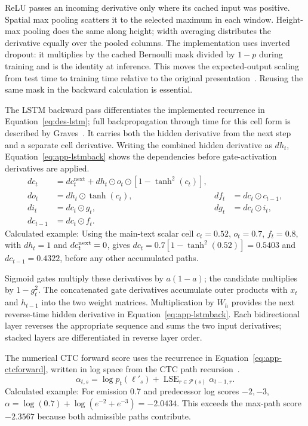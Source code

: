 ReLU passes an incoming derivative only where its cached input was positive. Spatial max pooling scatters it to the selected maximum in each window. Height-max pooling does the same along height; width averaging distributes the derivative equally over the pooled columns. The implementation uses inverted dropout: it multiplies by the cached Bernoulli mask divided by $1-p$ during training and is the identity at inference. This moves the expected-output scaling from test time to training time relative to the original presentation~\cite[pp.~1931, 1934]{srivastava2014}. Reusing the same mask in the backward calculation is essential.

The LSTM backward pass differentiates the implemented recurrence in Equation~\ref{eq:des-lstm}; full backpropagation through time for this cell form is described by Graves~\cite[pp.~4--5]{graves2013}. It carries both the hidden derivative from the next step and a separate cell derivative. Writing the combined hidden derivative as $d h_t$, Equation~\ref{eq:app-lstmback} shows the dependencies before gate-activation derivatives are applied.
\begin{equation}
\begin{aligned}
d c_t&=d c_t^{\mathrm{next}}+d h_t\odot o_t\odot[1-\tanh^2(c_t)],\\
d o_t&=d h_t\odot\tanh(c_t),& d f_t&=d c_t\odot c_{t-1},\\
d i_t&=d c_t\odot g_t,&d g_t&=d c_t\odot i_t,\\
d c_{t-1}&=d c_t\odot f_t.
\end{aligned}
\label{eq:app-lstmback}
\end{equation}
Calculated example: Using the main-text scalar cell $c_t=0.52$, $o_t=0.7$, $f_t=0.8$, with $dh_t=1$ and $dc_t^{\rm next}=0$, gives $dc_t=0.7[1-\tanh^2(0.52)]=0.5403$ and $dc_{t-1}=0.4322$, before any other accumulated paths.

Sigmoid gates multiply these derivatives by $a(1-a)$; the candidate multiplies by $1-g_t^2$. The concatenated gate derivatives accumulate outer products with $x_t$ and $h_{t-1}$ into the two weight matrices. Multiplication by $W_h$ provides the next reverse-time hidden derivative in Equation~\ref{eq:app-lstmback}. Each bidirectional layer reverses the appropriate sequence and sums the two input derivatives; stacked layers are differentiated in reverse layer order.

The numerical CTC forward score uses the recurrence in Equation~\ref{eq:app-ctcforward}, written in log space from the CTC path recursion~\cite[PDF p.~4, Sec.~4.1]{graves2006}.
\begin{equation}
\alpha_{t,s}=\log p_t(\ell'_s)+
\operatorname{LSE}_{r\in\mathcal P(s)}\alpha_{t-1,r}.
\label{eq:app-ctcforward}
\end{equation}
Calculated example: For emission 0.7 and predecessor log scores $-2,-3$, $\alpha=\log(0.7)+\log(e^{-2}+e^{-3})=-2.0434$. This exceeds the max-path score $-2.3567$ because both admissible paths contribute.

